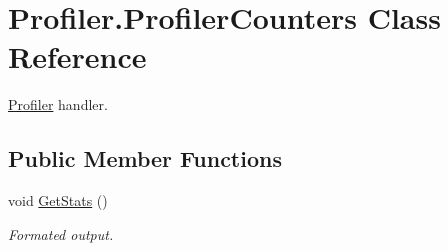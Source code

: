 \hypertarget{classProfiler_1_1ProfilerCounters}{}\section{Profiler.\+Profiler\+Counters Class Reference}
\label{classProfiler_1_1ProfilerCounters}


\hyperlink{classProfiler_1_1Profiler}{Profiler} handler.  


\subsection*{Public Member Functions}
\begin{DoxyCompactItemize}
\item 
void \hyperlink{classProfiler_1_1ProfilerCounters_a2916655d3b8db4b5705058c294bbcab5}{Get\+Stats} ()
\begin{DoxyCompactList}\small\item\em Formated output. \end{DoxyCompactList}\end{DoxyCompactItemize}
